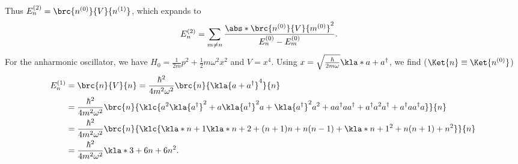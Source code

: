 \documentclass[english, parskip=full]{scrbook}
\begin{document}
Thus $E_n^{(2)} = \brc{n^{(0)}}{V}{n^{(1)}}$, which expands to
\begin{align}
E_n^{(2)} &= \sum_{m\neq n} \frac{\abs*{\brc{n^{(0)}}{V}{m^{(0)}}}^2}{E_n^{(0)} - E_m^{(0)}}.
\end{align}
For the anharmonic oscillator, we have $H_0 = \frac{1}{2m}p^2 + \frac{1}{2} m\omega^2x^2$ and $V=x^4$.
Using $x = \sqrt{\frac{\hbar}{2m\omega}} \kla*{a + a^\dagger}$, we find ($\Ket{n} \equiv \Ket{n^{(0)}}$)
\begin{align}
E_n^{(1)} &= \brc{n}{V}{n} = \frac{\hbar^2}{4m^2\omega^2} \brc{n}{\kla{a+a^\dagger}^4}{n} \\
&= \frac{\hbar^2}{4m^2\omega^2} \brc{n}{\klc{a^2 \kla{a^\dagger}^2 + a \kla{a^\dagger}^2 a + \kla{a^\dagger}^2 a^2 + aa^\dagger aa^\dagger + a^\dagger a^2 a^\dagger + a^\dagger aa^\dagger a}}{n}\\
&= \frac{\hbar^2}{4m^2\omega^2} \brc{n}{\klc{\kla*{n+1}\kla*{n+2} + (n+1)n + n(n-1) + \kla*{n+1}^2 + n(n+1) + n^2}}{n}\\
&= \frac{\hbar^2}{4m^2\omega^2} \kla*{3 + 6n + 6n^2}.
\end{align}
\end{document}
